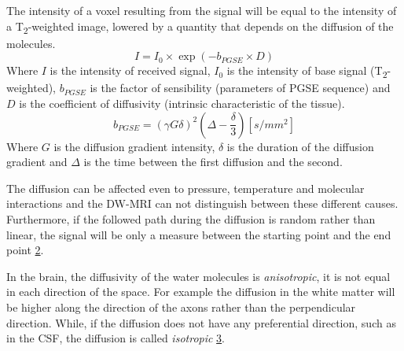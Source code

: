  The intensity of a voxel resulting from the signal will be equal to the intensity of a T\textsubscript{2}-weighted image, lowered by a quantity that depends on the diffusion of the molecules.
 \begin{equation}
    I = I_0 \times \exp(-b_{PGSE} \times D)
 \end{equation}
 Where $I$ is the intensity of received signal, $I_0$ is the intensity of base signal (T\textsubscript{2}-weighted), $b_{PGSE}$ is the factor of sensibility (parameters of PGSE sequence) and $D$ is the coefficient of diffusivity (intrinsic characteristic of the tissue).
 \begin{equation}
    b_ {PGSE} = (\gamma G \delta)^{2}(\Delta - \frac{\delta}{3}) [s/mm^2]
 \end{equation}
 Where $G$ is the diffusion gradient intensity, $\delta$ is the duration of the diffusion gradient and $\Delta$ is the time between the first diffusion and the second.

 \begin{figure}[h]
    \centering
    \caption{}
    \label{fig:PGSE}
 \end{figure}

 The diffusion can be affected even to pressure, temperature and molecular interactions and the DW-MRI can not distinguish between these different causes. Furthermore, if the followed path during the diffusion is random rather than linear, the signal will be only a measure between the starting point and the end point \ref{fig:displacement_dMRI}.

 \begin{figure}[h]
    \centering
    \caption{}
    \label{fig:displacement_dMRI}
 \end{figure}

 In the brain, the diffusivity of the water molecules is \emph{anisotropic}, it is not equal in each direction of the space. For example the diffusion in the white matter will be higher along the direction of the axons rather than the perpendicular direction. While, if the diffusion does not have any preferential direction, such as in the CSF, the diffusion is called \emph{isotropic} \ref{fig:isotropiAnisotropi}.

 \begin{figure}[h]
    \centering
    \caption{}
    \label{fig:isotropiAnisotropi}
 \end{figure}

